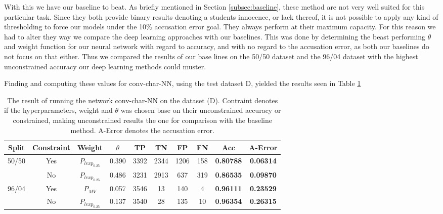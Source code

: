 With this we have our baseline to beat. As briefly mentioned in Section
\ref{subsec:baseline}, these method are not very well suited for this particular
task. Since they both provide binary results denoting a students innocence, or
lack thereof, it is not possible to apply any kind of thresholding to force
our models under the 10\% accusation error goal. They always perform at their
maximum capacity. For this reason we had to alter they way we compare the deep
learning approaches with our baselines. This was done by determining the beast
performing $\theta$ and weight function for our neural network with
regard to accuracy, and with no regard to the accusation error, as both
our baselines do not focus on that either. Thus we compared the
results of our base lines on the 50/50 dataset and the 96/04 dataset
with the highest unconstrained accuracy our deep learning methods could
muster.

Finding and computing these values for \gls{conv-char-NN},
using the test dataset D, yielded the results seen in Table \ref{tab:char_CNN_res}

\begin{table}[h]
\centering
\begin{tabular}{|c|c|c|c|c|c|c|c||c|c|}
\hline
Split & Constraint & Weight & $\theta$ & TP & TN & FP & FN & \textbf{Acc} & \textbf{A-Error} \\ \hline
\multirow{2}{*}{50/50} & Yes & $P_{lexp_{0.25}}$ & 0.390 & 3392 & 2344 & 1206 & 158 & \textbf{0.80788} & \textbf{0.06314} \\ \cline{2-10} 
 & No & $P_{lexp_{0.25}}$ & 0.486 & 3231 & 2913 & 637 & 319 & \textbf{0.86535} & \textbf{0.09870} \\ \hline
\multirow{2}{*}{96/04} & Yes & $P_{MV}$ & 0.057 & 3546 & 13 & 140 & 4 & \textbf{0.96111} & \textbf{0.23529} \\ \cline{2-10} 
 & No & $P_{lexp_{0.25}}$ & 0.137 & 3540 & 28 & 135 & 10 & \textbf{0.96354} & \textbf{0.26315} \\ \hline
\end{tabular}
\caption{The result of running the network \gls{conv-char-NN} on the dataset (D). Contraint
denotes if the hyperparameters, weight and $\theta$ was chosen base on their
unconstrained accuracy or constrained, making unconstrained results the one for 
comparison with the baseline method. A-Error denotes the accusation error.}
\label{tab:char_CNN_res}
\end{table}

